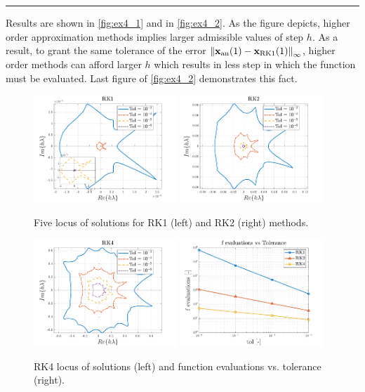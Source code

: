 \documentclass[11pt,a4paper,oneside]{article}
\renewcommand{\vec}[1]{\mathbf{#1}}
\begin{document}
\medskip \hrule \medskip

Results are shown in \autoref{fig:ex4_1} and in \autoref{fig:ex4_2}. As the figure depicts, higher order approximation 
methods implies larger admissible values of step $h$. As a result, to grant the same tolerance 
of the error $\left\|\vec x_{\rm an}(1)-\vec x_{\rm RK1}(1)\right\|_\infty$, higher order 
methods can afford larger $h$ which results in less step in which the function must be 
evaluated. Last figure of \autoref{fig:ex4_2} demonstrates this fact.
\begin{figure}[h]
\includegraphics[width=0.48\textwidth]{gfx/ex4_1.pdf}
    \includegraphics[width=0.48\textwidth]{gfx/ex4_2.pdf}
    \caption{Five locus of solutions for RK1 (left) and RK2 (right) methods.}
    \label{fig:ex4_1}
\end{figure}
\begin{figure}[h]
    \centering
    \includegraphics[width=0.48\textwidth]{gfx/ex4_3.pdf}
    \includegraphics[width=0.48\textwidth]{gfx/ex4_4.pdf}
    \caption{RK4 locus of solutions (left) and function evaluations vs. tolerance (right).}
    \label{fig:ex4_2}
\end{figure}
\end{document}
